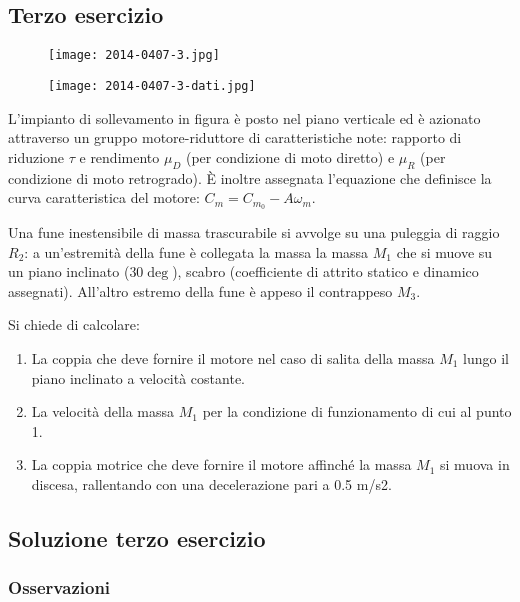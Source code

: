 \documentclass[main.tex]{subfiles}
\begin{document}
\subsection{Terzo esercizio}

\begin{figure}[H]
\centering
\texttt{[image: 2014-0407-3.jpg]}
\end{figure}

\begin{figure}[H]
\centering
\texttt{[image: 2014-0407-3-dati.jpg]}
\end{figure}

L’impianto di sollevamento in figura è posto nel piano verticale ed è azionato attraverso un gruppo motore-riduttore di caratteristiche note: rapporto di riduzione $\tau$ e rendimento $\mu_D$ (per condizione di moto diretto) e $\mu_R$ (per condizione di moto retrogrado). È inoltre assegnata l’equazione che definisce la curva caratteristica del motore: $C_m = C_{m_0} - A\omega_m$.

Una fune inestensibile di massa trascurabile si avvolge su una puleggia di raggio $R_2$: a un’estremità della fune è collegata la massa la massa $M_1$ che si muove su un piano inclinato ($30\deg$), scabro (coefficiente di attrito statico e dinamico assegnati). All’altro estremo della fune è appeso il contrappeso $M_3$.

Si chiede di calcolare:
\begin{enumerate}
\item La coppia che deve fornire il motore nel caso di salita della massa $M_1$ lungo il piano inclinato a velocità costante.
\item La velocità della massa $M_1$ per la condizione di funzionamento di cui al punto 1.
\item La coppia motrice che deve fornire il motore affinché la massa $M_1$ si muova in discesa, rallentando con una decelerazione pari a 0.5 m/s2.
\end{enumerate}

\clearpage

\subsection{Soluzione terzo esercizio}

\subsubsection{Osservazioni}
\end{document}
